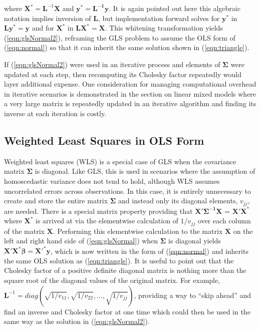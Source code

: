 \documentclass[12pt]{article}
\begin{document}
\noindent where $\bm{X}^{*} = \bm{L}^{-1}\bm{X}$ and $\bm{y}^* = \bm{L^{-1}}\bm{y}$. It is again pointed out here this algebraic notation implies inversion of $\bm{L}$, but implementation forward solves for $\bm{y}^*$ in $\bm{L}\bm{y}^* = \bm{y}$ and for $\bm{X}^{*}$ in $\bm{L}\bm{X}^{*} = \bm{X}$. This whitening transformation yields (\ref{eqn:glsNormal2}), reframing the GLS problem to assume the OLS form of (\ref{eqn:normal}) so that it can inherit the same solution shown in (\ref{eqn:triangle}).

If (\ref{eqn:glsNormal2}) were used in an iterative process and elements of $\bm{\Sigma}$ were updated at each step, then recomputing its Cholesky factor repeatedly would layer additional expense. One consideration for managing computational overhead in iterative scenarios is demonstrated in the section on linear mixed models where a very large matrix is repeatedly updated in an iterative algorithm and finding its inverse at each iteration is costly. 

\subsection*{Weighted Least Squares in OLS Form}

Weighted least squares (WLS) is a special case of GLS when the covariance matrix $\bm{\Sigma}$ is diagonal. Like GLS, this is used in scenarios where the assumption of homoscedastic variance does not tend to hold, although WLS assumes uncorrelated errors across observations. In this case, it is entirely unnecessary to create and store the entire matrix $\bm{\Sigma}$ and instead only its diagonal elements, $v_{jj}$, are needed. There is a special matrix property providing that $\bm{X'\Sigma^{-1}X}$ =  $\bm{X'X^*}$ where $\bm{X}^*$ is arrived at via the elementwise calculation of $1/v_{jj}$ over each column of the matrix $\bm{X}$. Performing this elementwise calculation to the matrix $\bm{X}$ on the left and right hand side of (\ref{eqn:glsNormal}) when $\bm{\Sigma}$ is diagonal yields $\bm{X'X^*}\bm{\beta} = \bm{X'^{*}y}$, which is now written in the form of (\ref{eqn:normal}) and inherits the same OLS solution as (\ref{eqn:triangle}). It is useful to point out that the Cholesky factor of a positive definite diagonal matrix is nothing more than the square root of the diagonal values of the original matrix. For example, $\bm{L}^{-1} = diag(\sqrt{1/v_{11}},\sqrt{1/v_{22}}, \ldots, \sqrt{1/v_{jj}})$, providing a way to ``skip ahead'' and find an inverse and Cholesky factor at one time which could then be used in the same way as the solution in (\ref{eqn:glsNormal2}). 
\end{document}
